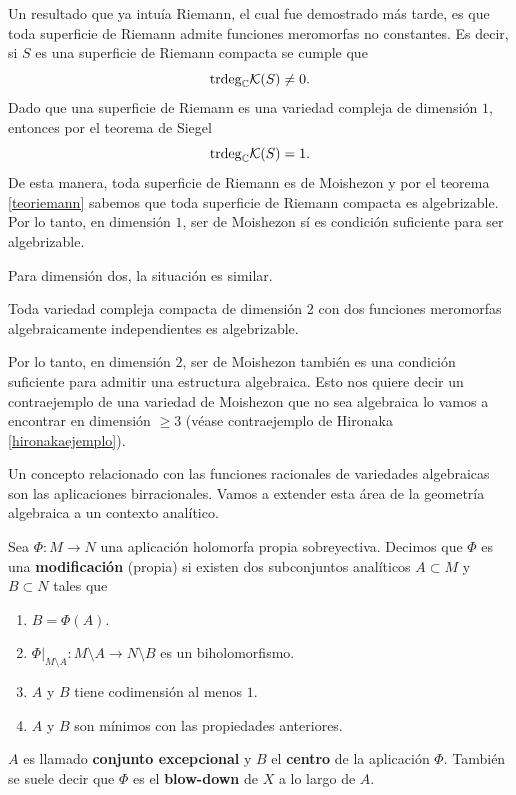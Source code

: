 Un resultado que ya intuía Riemann, el cual fue demostrado más tarde, es que toda superficie de Riemann admite funciones meromorfas no constantes. Es decir, si $S$ es una superficie de Riemann compacta se cumple que
\begin{equation*}
	\mathrm{trdeg}_{\mathbb{C}}\mathcal{K}(S)\neq 0.
\end{equation*}
Dado que una superficie de Riemann es una variedad compleja de dimensión $1$, entonces por el teorema de Siegel
\begin{equation*}
	\mathrm{trdeg}_{\mathbb{C}}\mathcal{K}(S)=1.
\end{equation*}
De esta manera, toda superficie de Riemann es de Moishezon y por el teorema \ref{teoriemann} sabemos que toda superficie de Riemann compacta es algebrizable. Por lo tanto, en dimensión $1$, ser de Moishezon sí es condición suficiente para ser algebrizable. 

Para dimensión dos, la situación es similar.
\begin{theorem}[Kodaira]
	Toda variedad compleja compacta de dimensión 2 con dos funciones meromorfas algebraicamente independientes es algebrizable.
\end{theorem}  
Por lo tanto, en dimensión $2$, ser de Moishezon también es una condición suficiente para admitir una estructura algebraica. Esto nos quiere decir un contraejemplo de una variedad de Moishezon que no sea algebraica lo vamos a encontrar en dimensión $\geq 3$ (véase contraejemplo de Hironaka \ref{hironakaejemplo}).

Un concepto relacionado con las funciones racionales de variedades algebraicas son las aplicaciones birracionales. Vamos a extender esta área de la geometría algebraica a un contexto analítico.

\begin{definition}[Modificación]
	Sea $\Phi:M\to N$ una aplicación holomorfa propia sobreyectiva. Decimos que $\Phi$ es una \textbf{modificación} (propia) si existen dos subconjuntos analíticos $A\subset M$ y $B\subset N$ tales que 
	\begin{enumerate}
		\item $B=\Phi(A)$.
		\item $\Phi|_{M\setminus A}:M\setminus A\to N\setminus B$ es un biholomorfismo. 
		\item $A$ y $B$ tiene codimensión al menos $1$.
		\item $A$ y $B$ son mínimos con las propiedades anteriores.
	\end{enumerate}
	$A$ es llamado \textbf{conjunto excepcional} y $B$ el \textbf{centro} de la aplicación $\Phi$. También se suele decir que $\Phi$ es el \textbf{blow-down} de $X$ a lo largo de $A$.
\end{definition}


